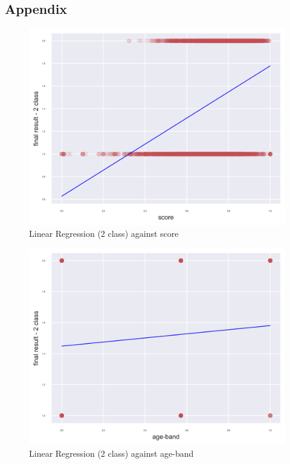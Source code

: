 \documentclass[11pt, a4paper]{article}
\begin{document}
\begin{multicols}{2}
\section*{Appendix}
\centering
\begin{figure}[H]
	\includegraphics[width=\linewidth]{LinearRegression_2_class_model_against_score.png} 
	\caption{Linear Regression (2 class) against score}
	\label{fig:LinScore}
\end{figure}
\centering
\begin{figure}[H]
	\includegraphics[width=\linewidth]{LinearRegression_2_class_model_against_age-band.png} 
	\caption{Linear Regression (2 class) against age-band}
	\label{fig:LinAge}
\end{figure}

\end{multicols}
\end{document}
